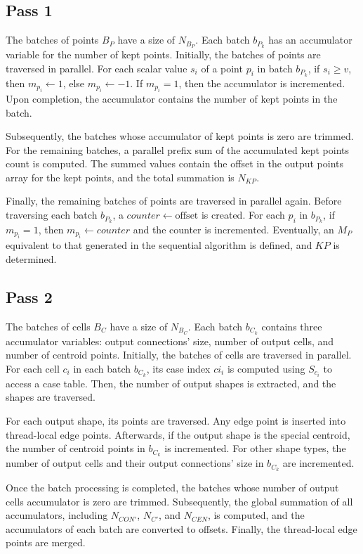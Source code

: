 \documentclass{egpubl}
\begin{document}
\subsection{Pass 1}
\label{sec:par-pass-1}

The batches of points $B_P$ have a size of $N_{B_P}$. Each batch $b_{P_k}$ has an accumulator variable for the number of kept points. Initially, the batches of points are traversed in parallel. For each scalar value $s_i$ of a point $p_i$ in batch $b_{P_k}$, if $s_i \ge v$, then $m_{p_i} \gets 1$, else $m_{p_i} \gets -1$. If $m_{p_i} = 1$, then the accumulator is incremented. Upon completion, the accumulator contains the number of kept points in the batch.

Subsequently, the batches whose accumulator of kept points is zero are trimmed. For the remaining batches, a parallel prefix sum of the accumulated kept points count is computed. The summed values contain the offset in the output points array for the kept points, and the total summation is $N_{KP}$.

Finally, the remaining batches of points are traversed in parallel again. Before traversing each batch $b_{P_k}$, a $counter \gets \text{offset}$ is created. For each $p_i$ in $b_{P_k}$, if $m_{p_i} = 1$, then $m_{p_i} \gets counter$ and the counter is incremented. Eventually, an $M_P$ equivalent to that generated in the sequential algorithm is defined, and $KP$ is determined.

\subsection{Pass 2}

The batches of cells $B_C$ have a size of $N_{B_C}$. Each batch $b_{C_k}$ contains three accumulator variables: output connections' size, number of output cells, and number of centroid points. Initially, the batches of cells are traversed in parallel. For each cell $c_i$ in each batch $b_{C_k}$, its case index $ci_i$ is computed using $S_{c_i}$ to access a case table. Then, the number of output shapes is extracted, and the shapes are traversed.

For each output shape, its points are traversed. Any edge point is inserted into thread-local edge points. Afterwards, if the output shape is the special centroid, the number of centroid points in $b_{C_k}$ is incremented. For other shape types, the number of output cells and their output connections' size in $b_{C_k}$ are incremented.

Once the batch processing is completed, the batches whose number of output cells accumulator is zero are trimmed. Subsequently, the global summation of all accumulators, including $N_{CON'}$, $N_{C'}$, and $N_{CEN}$, is computed, and the accumulators of each batch are converted to offsets. Finally, the thread-local edge points are merged.
\end{document}
